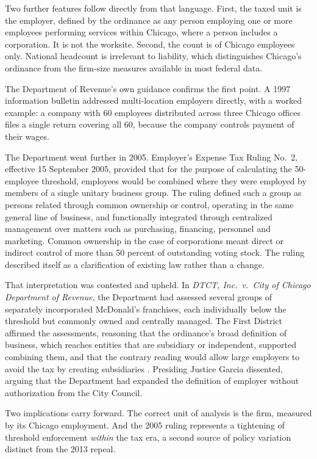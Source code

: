 \documentclass[12pt,letterpaper]{article}
\begin{document}
Two further features follow directly from that language. First, the taxed unit is the employer, defined by the ordinance as any person employing one or more employees performing services within Chicago, where a person includes a corporation. It is not the worksite. Second, the count is of Chicago employees only. National headcount is irrelevant to liability, which distinguishes Chicago's ordinance from the firm-size measures available in most federal data.

The Department of Revenue's own guidance confirms the first point. A 1997 information bulletin addressed multi-location employers directly, with a worked example: a company with 60 employees distributed across three Chicago offices files a single return covering all 60, because the company controls payment of their wages.

The Department went further in 2005. Employer's Expense Tax Ruling No.~2, effective 15 September 2005, provided that for the purpose of calculating the 50-employee threshold, employees would be combined where they were employed by members of a single unitary business group. The ruling defined such a group as persons related through common ownership or control, operating in the same general line of business, and functionally integrated through centralized management over matters such as purchasing, financing, personnel and marketing. Common ownership in the case of corporations meant direct or indirect control of more than 50 percent of outstanding voting stock. The ruling described itself as a clarification of existing law rather than a change.

That interpretation was contested and upheld. In \textit{DTCT, Inc.\ v.\ City of Chicago Department of Revenue}, the Department had assessed several groups of separately incorporated McDonald's franchises, each individually below the threshold but commonly owned and centrally managed. The First District affirmed the assessments, reasoning that the ordinance's broad definition of business, which reaches entities that are subsidiary or independent, supported combining them, and that the contrary reading would allow large employers to avoid the tax by creating subsidiaries \citep{dtct2011}. Presiding Justice Garcia dissented, arguing that the Department had expanded the definition of employer without authorization from the City Council.

Two implications carry forward. The correct unit of analysis is the firm, measured by its Chicago employment. And the 2005 ruling represents a tightening of threshold enforcement \textit{within} the tax era, a second source of policy variation distinct from the 2013 repeal.
\end{document}
